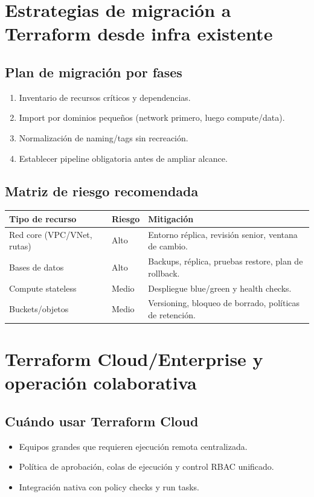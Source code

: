 \documentclass[12pt,a4paper]{article}
\begin{document}
\section{Estrategias de migración a Terraform desde infra existente}

\subsection{Plan de migración por fases}
\begin{enumerate}
		\item Inventario de recursos críticos y dependencias.
		\item Import por dominios pequeños (network primero, luego compute/data).
		\item Normalización de naming/tags sin recreación.
		\item Establecer pipeline obligatoria antes de ampliar alcance.
\end{enumerate}

\subsection{Matriz de riesgo recomendada}
\begin{longtable}{p{} p{} p{}}
\toprule
\textbf{Tipo de recurso} & \textbf{Riesgo} & \textbf{Mitigación} \\
\midrule
Red core (VPC/VNet, rutas) & Alto & Entorno réplica, revisión senior, ventana de cambio. \\
Bases de datos & Alto & Backups, réplica, pruebas restore, plan de rollback. \\
Compute stateless & Medio & Despliegue blue/green y health checks. \\
Buckets/objetos & Medio & Versioning, bloqueo de borrado, políticas de retención. \\
\bottomrule
\end{longtable}

\section{Terraform Cloud/Enterprise y operación colaborativa}

\subsection{Cuándo usar Terraform Cloud}
\begin{itemize}
		\item Equipos grandes que requieren ejecución remota centralizada.
		\item Política de aprobación, colas de ejecución y control RBAC unificado.
		\item Integración nativa con policy checks y run tasks.
\end{itemize}
\end{document}
